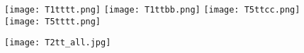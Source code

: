 \begin{figure}[!htb]
  \texttt{[image: T1tttt.png]}
\endminipage\hfill
{}
  \texttt{[image: T1ttbb.png]}
\endminipage\hfill
{}
  \texttt{[image: T5ttcc.png]}
\endminipage
{}
  \texttt{[image: T5tttt.png]}
\endminipage
\end{figure}

\begin{figure}[!htb]
  \texttt{[image: T2tt\_all.jpg]}
\endminipage\hfill
\end{figure}